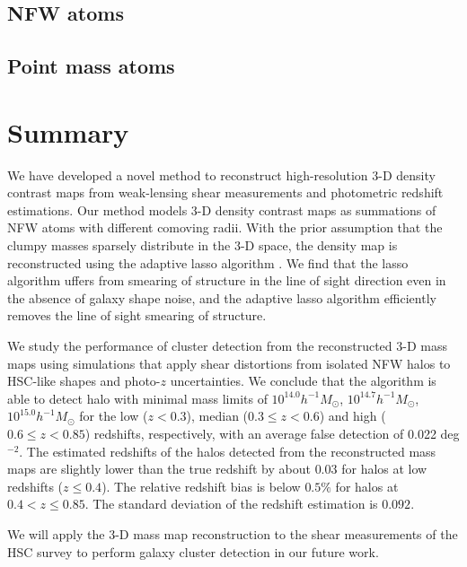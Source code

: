 \documentclass[twocolumn]{aastex63}
\begin{document}
\subsection{NFW atoms}
\label{subsec_test-nfw}


\subsection{Point mass atoms}
\label{subsec_test-pm}



\section{Summary}
\label{sec_Sum}

We have developed a novel method to reconstruct high-resolution $3$-D density
contrast maps from weak-lensing shear measurements and photometric redshift
estimations.  Our method models $3$-D density contrast maps as summations of
NFW atoms with different comoving radii.  With the prior assumption that the
clumpy masses sparsely distribute in the $3$-D space, the density map is
reconstructed using the adaptive lasso algorithm \citep{AdaLASSO-Zou2006}.
We find that the lasso algorithm uffers from smearing of structure
in the line of sight direction even in the absence of galaxy shape noise, and
the adaptive lasso algorithm efficiently removes the line of sight smearing of
structure.

We study the performance of cluster detection from the reconstructed $3$-D mass
maps using simulations that apply shear distortions from isolated NFW halos to
HSC-like shapes and photo-$z$ uncertainties.  We conclude that the algorithm is
able to detect halo with minimal mass limits of $10^{14.0} h^{-1}M_{\odot}$,
$10^{14.7} h^{-1}M_{\odot}$, $10^{15.0} h^{-1}M_{\odot}$ for the low ($z<0.3$),
median ($0.3\leq z< 0.6$) and high ($0.6\leq z< 0.85$) redshifts, respectively,
with an average false detection of 0.022 deg$^{-2}$. The estimated redshifts of
the halos detected from the reconstructed mass maps are slightly lower than the
true redshift by about $0.03$ for halos at low redshifts ($z\leq 0.4$).  The
relative redshift bias is below $0.5\%$ for halos at $0.4<z\leq 0.85$. The
standard deviation of the redshift estimation is $0.092$.

We will apply the $3$-D mass map reconstruction to the shear measurements of
the HSC survey \citep[e.g.,][]{HSC1-catalog,FPFSHSC1-Li2020} to perform galaxy
cluster detection in our future work.
\end{document}
